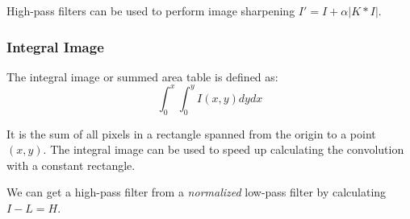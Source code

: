 High-pass filters can be used to perform image sharpening $I' = I + \alpha |K * I|$.

\subsubsection{Integral Image}

The integral image or summed area table is defined as:
$$\int_0^x \int_0^y I(x,y)dydx$$

It is the sum of all pixels in a rectangle spanned from the origin to a point $(x,y)$. The integral image can be used to speed up calculating the convolution with a constant rectangle. \medskip

We can get a high-pass filter from a \textit{normalized} low-pass filter by calculating $I - L = H$.
